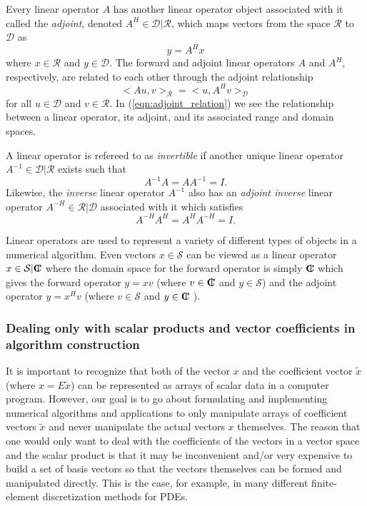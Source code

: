 Every linear operator $A$ has another linear operator object associated with
it called the {}\textit{adjoint}, denoted $A^H\in\mathcal{D}|\mathcal{R}$,
which maps vectors from the space $\mathcal{R}$ to $\mathcal{D}$ as
%
\begin{equation}
y = A^H x
\label{eqn:adjoint_op_apply}
\end{equation}
%
where $x\in\mathcal{R}$ and $y\in\mathcal{D}$.  The forward and adjoint linear
operators $A$ and $A^H$, respectively, are related to each other through the
adjoint relationship
%
\begin{equation}
<A u, v>_{\mathcal{R}} = <u,A^H v>_{\mathcal{D}}
\label{eqn:adjoint_relation}
\end{equation}
%
for all $u\in\mathcal{D}$ and $v\in\mathcal{R}$.  In
(\ref{eqn:adjoint_relation}) we see the relationship between a linear
operator, its adjoint, and its associated range and domain spaces.

A linear operator is refereed to as {}\textit{invertible} if another unique
linear operator $A^{-1}\in\mathcal{D}|\mathcal{R}$ exists such that
%
\[
A^{-1} A = A A^{-1} = I.
\]
%
Likewise, the {}\textit{inverse} linear operator $A^{-1}$ also has an
{}\textit{adjoint inverse} linear operator $A^{-H}\in\mathcal{R}|\mathcal{D}$
associated with it which satisfies
%
\[
A^{-H} A^H = A^H A^{-H} = I.
\]
%

Linear operators are used to represent a variety of different types of objects
in a numerical algorithm.  Even vectors $x\in\mathcal{S}$ can be viewed as a
linear operator $x\in\mathcal{S}|\mbox{\textbf{C}}\hspace{-1.1ex}\mbox{l}\hspace{0.4ex}$ where the domain space for the forward
operator is simply $\mbox{\textbf{C}}\hspace{-1.1ex}\mbox{l}\hspace{0.4ex}$ which gives the forward operator $y = x v$ (where
$v\in\mbox{\textbf{C}}\hspace{-1.1ex}\mbox{l}\hspace{0.4ex}$ and $y\in\mathcal{S}$) and the adjoint operator $y = x^H v$ (where
$v\in\mathcal{S}$ and $y\in\mbox{\textbf{C}}\hspace{-1.1ex}\mbox{l}\hspace{0.4ex}$ ).

\subsubsection{Dealing only with scalar products and vector coefficients in algorithm construction}

It is important to recognize that both of the vector $x$ and the coefficient
vector $\tilde{x}$ (where $x = E\tilde{x}$) can be represented as arrays of
scalar data in a computer program.  However, our goal is to go about
formulating and implementing numerical algorithms and applications to only
manipulate arrays of coefficient vectors $\tilde{x}$ and never manipulate the
actual vectors $x$ themselves.  The reason that one would only want to deal
with the coefficients of the vectors in a vector space and the scalar product
is that it may be inconvenient and/or very expensive to build a set of basis
vectors so that the vectors themselves can be formed and manipulated directly.
This is the case, for example, in many different finite-element discretization
methods for PDEs.

